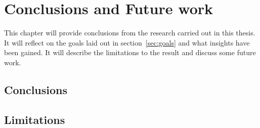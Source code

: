 ﻿\chapter{Conclusions and Future work}
\label{ch:conclusionsAndFutureWork}




This chapter will provide conclusions from the research carried out in this thesis. It will reflect on the goals laid out in section~\ref{sec:goals} and what insights have been gained. It will describe the limitations to the result and discuss some future work.


\section{Conclusions}
\label{sec:conclusions}










\section{Limitations}
\label{sec:limitations}




